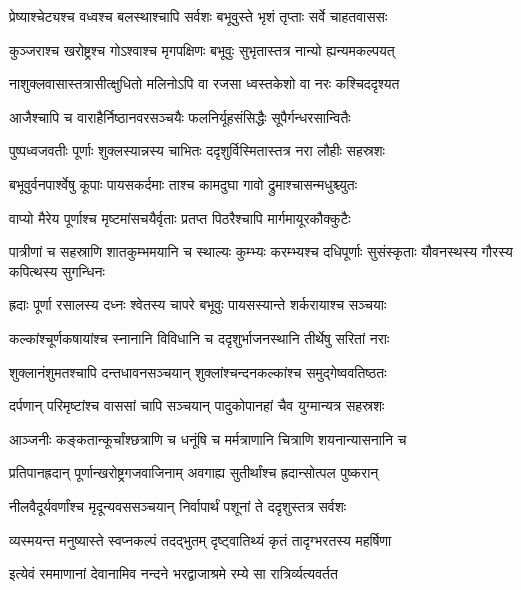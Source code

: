 \twolineshloka
{प्रेष्याश्चेट्यश्च वध्वश्च बलस्थाश्चापि सर्वशः}
{बभूवुस्ते भृशं तृप्ताः सर्वे चाहतवाससः} %

\twolineshloka
{कुञ्जराश्च खरोष्ट्रश्च गोऽश्वाश्च मृगपक्षिणः}
{बभूवुः सुभृतास्तत्र नान्यो ह्यन्यमकल्पयत्} %

\twolineshloka
{नाशुक्लवासास्तत्रासीत्क्षुधितो मलिनोऽपि वा}
{रजसा ध्वस्तकेशो वा नरः कश्चिददृश्यत} %

\twolineshloka
{आजैश्चापि च वाराहैर्निष्ठानवरसञ्चयैः}
{फलनिर्यूहसंसिद्धैः सूपैर्गन्धरसान्वितैः} %

\twolineshloka
{पुष्पध्वजवतीः पूर्णाः शुक्लस्यान्नस्य चाभितः}
{ददृशुर्विस्मितास्तत्र नरा लौहीः सहस्रशः} %

\twolineshloka
{बभूवुर्वनपार्श्वेषु कूपाः पायसकर्दमाः}
{ताश्च कामदुघा गावो द्रुमाश्चासन्मधुश्च्युतः} %

\twolineshloka
{वाप्यो मैरेय पूर्णाश्च मृष्टमांसचयैर्वृताः}
{प्रतप्त पिठरैश्चापि मार्गमायूरकौक्कुटैः} %

\threelineshloka
{पात्रीणां च सहस्राणि शातकुम्भमयानि च}
{स्थाल्यः कुम्भ्यः करम्भ्यश्च दधिपूर्णाः सुसंस्कृताः}
{यौवनस्थस्य गौरस्य कपित्थस्य सुगन्धिनः} %

\twolineshloka
{ह्रदाः पूर्णा रसालस्य दध्नः श्वेतस्य चापरे}
{बभूवुः पायसस्यान्ते शर्करायाश्च सञ्चयाः} %

\twolineshloka
{कल्कांश्चूर्णकषायांश्च स्नानानि विविधानि च}
{ददृशुर्भाजनस्थानि तीर्थेषु सरितां नराः} %

\twolineshloka
{शुक्लानंशुमतश्चापि दन्तधावनसञ्चयान्}
{शुक्लांश्चन्दनकल्कांश्च समुद्गेष्ववतिष्ठतः} %

\twolineshloka
{दर्पणान् परिमृष्टांश्च वाससां चापि सञ्चयान्}
{पादुकोपानहां चैव युग्मान्यत्र सहस्रशः} %

\twolineshloka
{आञ्जनीः कङ्कतान्कूर्चांश्छत्राणि च धनूंषि च}
{मर्मत्राणानि चित्राणि शयनान्यासनानि च} %

\twolineshloka
{प्रतिपानह्रदान् पूर्णान्खरोष्ट्रगजवाजिनाम्}
{अवगाह्य सुतीर्थांश्च ह्रदान्सोत्पल पुष्करान्} %

\twolineshloka
{नीलवैदूर्यवर्णांश्च मृदून्यवससञ्चयान्}
{निर्वापार्थं पशूनां ते ददृशुस्तत्र सर्वशः} %

\twolineshloka
{व्यस्मयन्त मनुष्यास्ते स्वप्नकल्पं तदद्भुतम्}
{दृष्ट्वातिथ्यं कृतं तादृग्भरतस्य महर्षिणा} %

\twolineshloka
{इत्येवं रममाणानां देवानामिव नन्दने}
{भरद्वाजाश्रमे रम्ये सा रात्रिर्व्यत्यवर्तत} %

